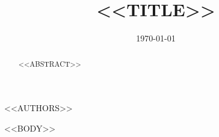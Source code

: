 \documentclass[aps,prd,twocolumn,superscriptaddress,nofootinbib,showpacs=false]{revtex4-2}
\begin{document}
\title{<<TITLE>>}

<<AUTHORS>>

\date{\today}

\begin{abstract}
<<ABSTRACT>>
\end{abstract}


\maketitle

<<BODY>>


\end{document}
